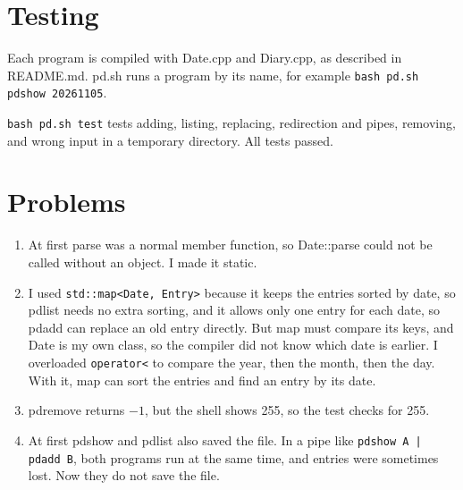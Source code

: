 \documentclass[11pt,a4paper]{article}
\begin{document}
\begin{center}
\end{center}

\section{Testing}

Each program is compiled with Date.cpp and Diary.cpp, as described in
README.md. pd.sh runs a program by its name, for example
\texttt{bash pd.sh pdshow 20261105}.

\texttt{bash pd.sh test} tests adding, listing, replacing, redirection and
pipes, removing, and wrong input in a temporary directory. All tests passed.

\section{Problems}

\begin{enumerate}
  \item At first parse was a normal member function, so Date::parse could not be
        called without an object. I made it static.
  \item I used \texttt{std::map<Date, Entry>} because it keeps the entries
        sorted by date, so pdlist needs no extra sorting, and it allows only one
        entry for each date, so pdadd can replace an old entry directly. But map
        must compare its keys, and Date is my own class, so the compiler did not
        know which date is earlier. I overloaded \texttt{operator<} to compare
        the year, then the month, then the day. With it, map can sort the
        entries and find an entry by its date.
  \item pdremove returns $-1$, but the shell shows 255, so the test checks for 255.
  \item At first pdshow and pdlist also saved the file. In a pipe like
        \texttt{pdshow A | pdadd B}, both programs run at the same time, and
        entries were sometimes lost. Now they do not save the file.
\end{enumerate}
\end{document}
